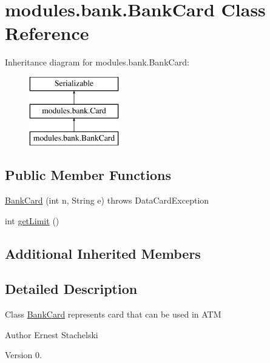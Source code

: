 \hypertarget{classmodules_1_1bank_1_1_bank_card}{}\section{modules.\+bank.\+Bank\+Card Class Reference}
\label{classmodules_1_1bank_1_1_bank_card}
Inheritance diagram for modules.\+bank.\+Bank\+Card\+:\begin{figure}[H]
\begin{center}
\leavevmode
\includegraphics[height=3.000000cm]{classmodules_1_1bank_1_1_bank_card}
\end{center}
\end{figure}
\subsection*{Public Member Functions}
\begin{DoxyCompactItemize}
\item 
\mbox{\hyperlink{classmodules_1_1bank_1_1_bank_card_a1f5afbac8d1567ac220a7df1ad4c9741}{Bank\+Card}} (int n, String e)  throws Data\+Card\+Exception 
\item 
int \mbox{\hyperlink{classmodules_1_1bank_1_1_bank_card_ab72e9a1b96dc32bd70c373db4e4f6a17}{get\+Limit}} ()
\end{DoxyCompactItemize}
\subsection*{Additional Inherited Members}


\subsection{Detailed Description}
Class \mbox{\hyperlink{classmodules_1_1bank_1_1_bank_card}{Bank\+Card}} represents card that can be used in A\+TM \begin{DoxyAuthor}{Author}
Ernest Stachelski 
\end{DoxyAuthor}
\begin{DoxyVersion}{Version}
0. 
\end{DoxyVersion}


